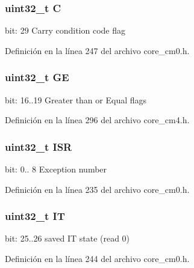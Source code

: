 \subsubsection[{\texorpdfstring{C}{C}}]{\setlength{\rightskip}{0pt plus 5cm}uint32\+\_\+t C}\hypertarget{unionx_p_s_r___type_a7a1caf92f32fe9ebd8d1fe89b06c7776}{}\label{unionx_p_s_r___type_a7a1caf92f32fe9ebd8d1fe89b06c7776}
bit\+: 29 Carry condition code flag 

Definición en la línea 247 del archivo core\+\_\+cm0.\+h.

\subsubsection[{\texorpdfstring{GE}{GE}}]{\setlength{\rightskip}{0pt plus 5cm}uint32\+\_\+t GE}\hypertarget{unionx_p_s_r___type_aa91800ec6e90e457c7a1acd1f2e17099}{}\label{unionx_p_s_r___type_aa91800ec6e90e457c7a1acd1f2e17099}
bit\+: 16..19 Greater than or Equal flags 

Definición en la línea 296 del archivo core\+\_\+cm4.\+h.

\subsubsection[{\texorpdfstring{I\+SR}{ISR}}]{\setlength{\rightskip}{0pt plus 5cm}uint32\+\_\+t I\+SR}\hypertarget{unionx_p_s_r___type_ad502ba7dbb2aab5f87c782b28f02622d}{}\label{unionx_p_s_r___type_ad502ba7dbb2aab5f87c782b28f02622d}
bit\+: 0.. 8 Exception number 

Definición en la línea 235 del archivo core\+\_\+cm0.\+h.

\subsubsection[{\texorpdfstring{IT}{IT}}]{\setlength{\rightskip}{0pt plus 5cm}uint32\+\_\+t IT}\hypertarget{unionx_p_s_r___type_a76485660fe8ad98cdc71ddd7cb0ed777}{}\label{unionx_p_s_r___type_a76485660fe8ad98cdc71ddd7cb0ed777}
bit\+: 25..26 saved IT state (read 0) 

Definición en la línea 244 del archivo core\+\_\+cm0.\+h.

